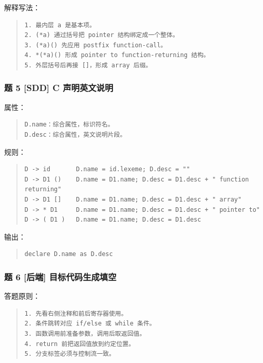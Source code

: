 \documentclass[UTF8,zihao=-4]{ctexart}
\begin{document}
解释写法：


\begin{quote}
\footnotesize
\begin{verbatim}
1. 最内层 a 是基本项。
2. (*a) 通过括号把 pointer 结构绑定成一个整体。
3. (*a)() 先应用 postfix function-call。
4. *(*a)() 形成 pointer to function-returning 结构。
5. 外层括号后再接 []，形成 array 后缀。
\end{verbatim}
\end{quote}


\subsubsection{题 5 [SDD] C 声明英文说明}


属性：


\begin{quote}
\footnotesize
\begin{verbatim}
D.name：综合属性，标识符名。
D.desc：综合属性，英文说明片段。
\end{verbatim}
\end{quote}


规则：


\begin{quote}
\footnotesize
\begin{verbatim}
D -> id       D.name = id.lexeme; D.desc = ""
D -> D1 ()    D.name = D1.name; D.desc = D1.desc + " function returning"
D -> D1 []    D.name = D1.name; D.desc = D1.desc + " array"
D -> * D1     D.name = D1.name; D.desc = D1.desc + " pointer to"
D -> ( D1 )   D.name = D1.name; D.desc = D1.desc
\end{verbatim}
\end{quote}


输出：


\begin{quote}
\footnotesize
\begin{verbatim}
declare D.name as D.desc
\end{verbatim}
\end{quote}


\subsubsection{题 6 [后端] 目标代码生成填空}


答题原则：


\begin{quote}
\footnotesize
\begin{verbatim}
1. 先看右侧注释和前后寄存器使用。
2. 条件跳转对应 if/else 或 while 条件。
3. 函数调用前准备参数，调用后取返回值。
4. return 前把返回值放到约定位置。
5. 分支标签必须与控制流一致。
\end{verbatim}
\end{quote}
\end{document}
